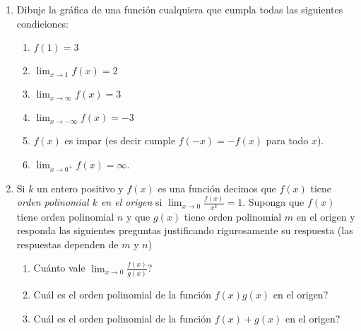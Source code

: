 \documentclass[12pt, a4paper]{article}
\begin{document}
\begin{enumerate}
\item Dibuje la gráfica de una función cualquiera que cumpla todas las siguientes condiciones:
\begin{enumerate}
\item $f(1)=3$
\item $\lim_{x\rightarrow 1} f(x)=2$
\item $\lim_{x\rightarrow \infty} f(x)=3$
\item $\lim_{x\rightarrow -\infty} f(x)=-3$
\item $f(x)$ es impar (es decir cumple $f(-x)=-f(x)$ para todo $x$).
\item $\lim_{x\rightarrow 0^{+}} f(x)=\infty$.
\end{enumerate}

\item Si $k$ un entero positivo y $f(x)$ es una función decimos que $f(x)$ tiene \emph{orden polinomial $k$ en el origen} si $\lim_{x\rightarrow 0} \frac{f(x)}{x^k}=1$. Suponga que $f(x)$ tiene orden polinomial $n$ y que $g(x)$ tiene orden polinomial $m$ en el origen y responda las siguientes preguntas justificando rigurosamente su respuesta (las respuestas dependen de $m$ y $n$)

\begin{enumerate}
\item Cuánto vale $\lim_{x\rightarrow 0} \frac{f(x)}{g(x)}$?
\item Cuál es el orden polinomial de la función $f(x)g(x)$ en el origen?
\item Cuál es el orden polinomial de la función $f(x)+g(x)$ en el origen?
\end{enumerate}


\end{enumerate}
\end{document}
